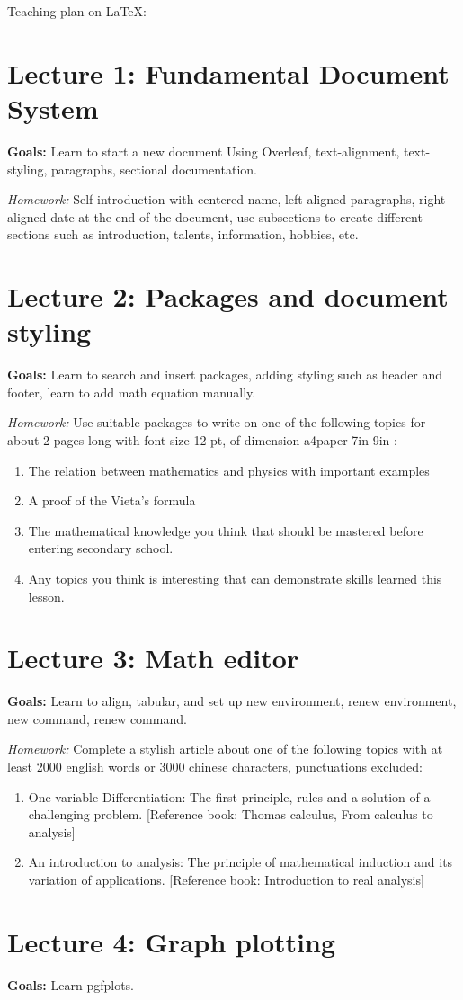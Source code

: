 \documentclass[12pt]{article}
\begin{document}
    Teaching plan on LaTeX:
    
    \section*{Lecture 1: Fundamental Document System}

    \textbf{Goals: } Learn to start a new document Using Overleaf, text-alignment, text-styling, paragraphs, sectional documentation.

    \textit{Homework: } Self introduction with centered name, left-aligned paragraphs, right-aligned date at the end of the document, use subsections to create different sections such as introduction, talents, information, hobbies, etc.
    
    \section*{Lecture 2: Packages and document styling}

    \textbf{Goals: } Learn to search and insert packages, adding styling such as header and footer, learn to add math equation manually.

    \textit{Homework: } Use suitable packages to write on one of the following topics for about 2 pages long with font size 12 pt, of dimension a4paper 7in 9in :\begin{enumerate}
        \item The relation between mathematics and physics with important examples
        \item A proof of the Vieta's formula
        \item The mathematical knowledge you think that should be mastered before entering secondary school.
        \item Any topics you think is interesting that can demonstrate skills learned this lesson.
    \end{enumerate}
    
    \section*{Lecture 3: Math editor}

    \textbf{Goals: } Learn to align, tabular, and set up new environment, renew environment, new command, renew command.

    \textit{Homework: } Complete a stylish article about one of the following topics with at least 2000 english words or 3000 chinese characters, punctuations excluded:\begin{enumerate}
        \item One-variable Differentiation: The first principle, rules and a solution of a challenging problem. [Reference book: Thomas calculus, From calculus to analysis]
        \item An introduction to analysis: The principle of mathematical induction and its variation of applications. [Reference book: Introduction to real analysis]
    \end{enumerate}

    \section*{Lecture 4: Graph plotting}

    \textbf{Goals: } Learn pgfplots.
\end{document}
